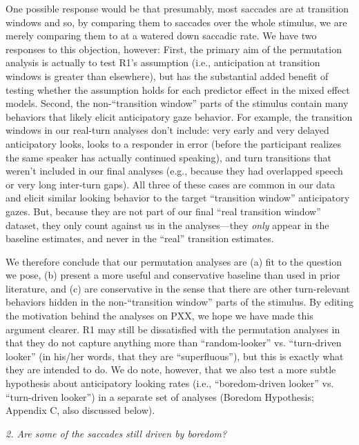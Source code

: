 \documentclass[11pt,a4paper]{letter} %
\begin{document}
\begin{letter}{}
\noindent One possible response would be that presumably, most saccades are at transition windows and so, by comparing them to saccades over the whole stimulus, we are merely comparing them to at a watered down saccadic rate. We have two responses to this objection, however: First, the primary aim of the permutation analysis is actually to test R1's assumption (i.e., anticipation at transition windows is greater than elsewhere), but has the substantial added benefit of testing whether the assumption holds for each predictor effect in the mixed effect models. Second, the non-``transition window'' parts of the stimulus contain many behaviors that likely elicit anticipatory gaze behavior. For example, the transition windows in our real-turn analyses don't include: very early and very delayed anticipatory looks, looks to a responder in error (before the participant realizes the same speaker has actually continued speaking), and turn transitions that weren't included in our final analyses (e.g., because they had overlapped speech or very long inter-turn gaps). All three of these cases are common in our data and elicit similar looking behavior to the target ``transition window'' anticipatory gazes. But, because they are not part of our final ``real transition window'' dataset, they only count against us in the analyses---they \textit{only} appear in the baseline estimates, and never in the ``real'' transition estimates.

\noindent We therefore conclude that our permutation analyses are (a)  fit to the question we pose, (b) present a more useful and conservative baseline than used in prior literature, and (c) are conservative in the sense that there are other turn-relevant behaviors hidden in the non-``transition window'' parts of the stimulus. By editing the motivation behind the analyses on PXX, we hope we have made this argument clearer. R1 may still be dissatisfied with the permutation analyses in that they do not capture anything more than ``random-looker'' vs. ``turn-driven looker'' (in his/her words, that they are ``superfluous''), but this is exactly what they are intended to do. We do note, however, that we also test a more subtle hypothesis about anticipatory looking rates (i.e., ``boredom-driven looker'' vs. ``turn-driven looker'') in a separate set of analyses (Boredom Hypothesis; Appendix C, also discussed below).

\noindent \textit{2. Are some of the saccades still driven by boredom?}


\end{letter}
\end{document}
